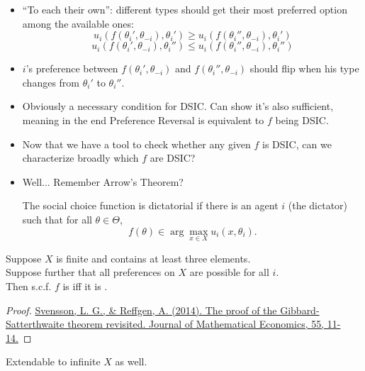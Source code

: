 \documentclass[english,handout,10pt]{beamer}		%
\def\lyxframeend{} %
\begin{document}
\begin{itemize}
	\item ``To each their own'': different types should get their most preferred option among the available ones:
	$$ u_{i}(f(\theta_{i}', \theta_{-i}), \theta_{i}') \geq u_{i}(f(\theta_{i}'', \theta_{-i}), \theta_{i}')$$
	$$ u_{i}(f(\theta_{i}', \theta_{-i}), \theta_{i}'') \leq u_{i}(f(\theta_{i}'', \theta_{-i}), \theta_{i}'')$$
	\item $i$'s preference between $f(\theta_{i}', \theta_{-i})$ and $f(\theta_{i}'', \theta_{-i})$ should flip when his type changes from $\theta_i'$ to $\theta_i''$.
	\item Obviously a necessary condition for DSIC. Can show it's also sufficient, meaning in the end Preference Reversal is equivalent to $f$ being DSIC.
\end{itemize}
\lyxframeend


\begin{itemize}
	\item Now that we have a tool to check whether any given $f$ is DSIC, can we characterize broadly which $f$ are DSIC?
	\pause
	\item Well... Remember Arrow's Theorem?
	\pause
	\begin{definition}[Dictatorial s.c.f.]
		The social choice function is dictatorial if there is an agent $i$ (the dictator) such that for all $\theta\in\Theta$,
		$$ f(\theta)\in \arg \max_{x \in X} u_i(x,\theta_i).$$
	\end{definition}
\end{itemize}
\lyxframeend


\begin{theorem}
	Suppose $X$ is finite and contains at least three elements. \\
	Suppose further that all preferences on $X$ are possible for all $i$.\\ 
	Then s.c.f. $f$ is  \alert{iff} it is .
\end{theorem}
\begin{proof}[Proof]
	\href{http://dx.doi.org/10.1016/j.jmateco.2014.09.007}{Svensson, L. G., \& Reffgen, A. (2014). The proof of the Gibbard-Satterthwaite theorem revisited. Journal of Mathematical Economics, 55, 11-14.}
\end{proof}
Extendable to infinite $X$ as well.
\lyxframeend
\end{document}
